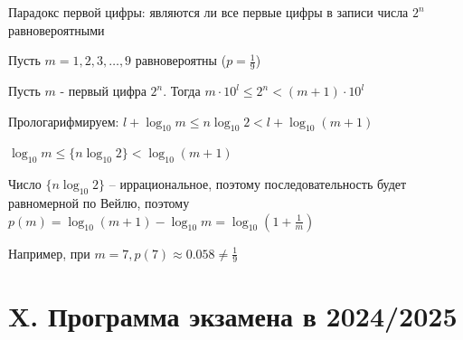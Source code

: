 \documentclass[12pt]{article}
\begin{document}
Парадокс первой цифры: являются ли все первые цифры в записи числа $2^n$ равновероятными

Пусть $m = 1, 2, 3, \dots, 9$ равновероятны ($p = \frac{1}{9}$)

Пусть $m$ - первый цифра $2^n$. Тогда $m \cdot 10^l \leq 2^n < (m + 1) \cdot 10^l$

Прологарифмируем: $l + \log_{10} m \leq n \log_{10} 2 < l + \log_{10} (m + 1)$

$\log_{10} m \leq \{n \log_{10} 2\} < \log_{10} (m + 1)$

Число $\{n \log_{10} 2\}$ -- иррациональное, поэтому последовательность будет равномерной по Вейлю, поэтому $p(m) = \log_{10} (m + 1) - \log_{10} m = \log_{10} \left(1 + \frac{1}{m}\right)$

Например, при $m = 7, p(7) \approx 0.058 \neq \frac{1}{9}$


\clearpage

\section{X. Программа экзамена в 2024/2025}
\end{document}
